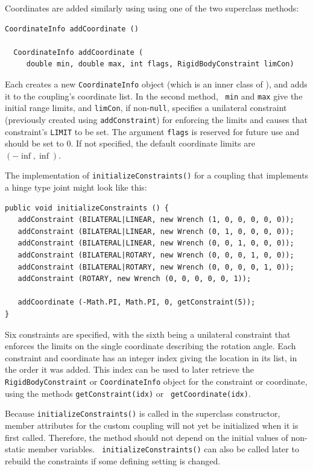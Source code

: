 Coordinates are added similarly using using one of the two superclass
methods:
%
\begin{lstlisting}[]
  CoordinateInfo addCoordinate ()

  CoordinateInfo addCoordinate (
     double min, double max, int flags, RigidBodyConstraint limCon)
\end{lstlisting}
%
Each creates a new {\tt CoordinateInfo} object (which is an inner
class of ), and
adds it to the coupling's coordinate list. In the second method, {\tt
min} and {\tt max} give the initial range limits, and {\tt limCon}, if
non-{\tt null}, specifies a unilateral constraint (previously created
using {\tt addConstraint}) for enforcing the limits and causes that
constraint's {\tt LIMIT} to be set.  The argument {\tt flags} is
reserved for future use and should be set to 0. If not specified, the
default coordinate limits are $(-\inf, \inf)$.

The implementation of {\tt initializeConstraints()} for a coupling
that implements a hinge type joint might look like this:
%
\begin{lstlisting}[]
public void initializeConstraints () {
   addConstraint (BILATERAL|LINEAR, new Wrench (1, 0, 0, 0, 0, 0));
   addConstraint (BILATERAL|LINEAR, new Wrench (0, 1, 0, 0, 0, 0));
   addConstraint (BILATERAL|LINEAR, new Wrench (0, 0, 1, 0, 0, 0));
   addConstraint (BILATERAL|ROTARY, new Wrench (0, 0, 0, 1, 0, 0));
   addConstraint (BILATERAL|ROTARY, new Wrench (0, 0, 0, 0, 1, 0));
   addConstraint (ROTARY, new Wrench (0, 0, 0, 0, 0, 1));

   addCoordinate (-Math.PI, Math.PI, 0, getConstraint(5));
}
\end{lstlisting}
%
Six constraints are specified, with the sixth being a unilateral
constraint that enforces the limits on the single coordinate
describing the rotation angle.  Each constraint and coordinate has an
integer index giving the location in its list, in the order it was
added. This index can be used to later retrieve the {\tt
RigidBodyConstraint} or {\tt CoordinateInfo} object for the constraint
or coordinate, using the methods {\tt getConstraint(idx)} or {\tt
getCoordinate(idx)}.

\begin{sideblock}
Because {\tt initializeConstraints()} is called in the superclass
constructor, member attributes for the custom coupling will not yet be
initialized when it is first called. Therefore, the method should not
depend on the initial values of non-static member variables.  {\tt
initializeConstraints()} can also be called later to rebuild the
constraints if some defining setting is changed.
\end{sideblock}

